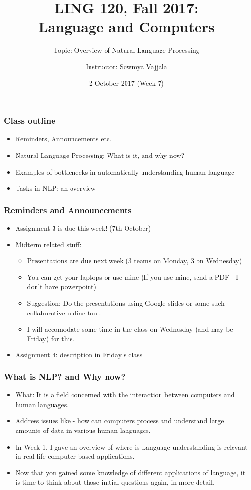 \documentclass{beamer}
\author[Sowmya Vajjala]{Instructor: Sowmya Vajjala}
\title[LING 120]{LING 120, Fall 2017: \\ Language and Computers}
\subtitle{Topic: Overview of Natural Language Processing}
\date{2 October 2017 (Week 7)}
\institute{Iowa State University, USA}
\begin{document}
\begin{frame}\titlepage
\end{frame}

\begin{frame}%
\frametitle{Class outline}
\begin{itemize}
\item Reminders, Announcements etc.
\item Natural Language Processing: What is it, and why now?
\item Examples of bottlenecks in automatically understanding human language
\item Tasks in NLP: an overview
\end{itemize}
\end{frame}

\begin{frame}
\frametitle{Reminders and Announcements}
\begin{itemize}
\item Assignment 3 is due this week! (7th October) \pause 
\item Midterm related stuff:
\begin{itemize}
\item Presentations are due next week (3 teams on Monday, 3 on Wednesday)
\item You can get your laptops or use mine (If you use mine, send a PDF - I don't have powerpoint)
\item Suggestion: Do the presentations using Google slides or some such collaborative online tool.
\item I will accomodate some time in the class on Wednesday (and may be Friday) for this. 
\end{itemize} \pause
\item Assignment 4: description in Friday's class
\end{itemize}
\end{frame}

\begin{frame}
\frametitle{What is NLP? and Why now?}
\begin{itemize}
\item What: It is a field concerned with the interaction between computers and human languages. 
\item Address issues like - how can computers process and understand large amounts of data in various human languages. \pause
\item In Week 1, I gave an overview of where is Language understanding is relevant in real life computer based applications. 
\item Now that you gained some knowledge of different applications of language, it is time to think about those initial questions again, in more detail. 
\end{itemize}
\end{frame}
\end{document}
